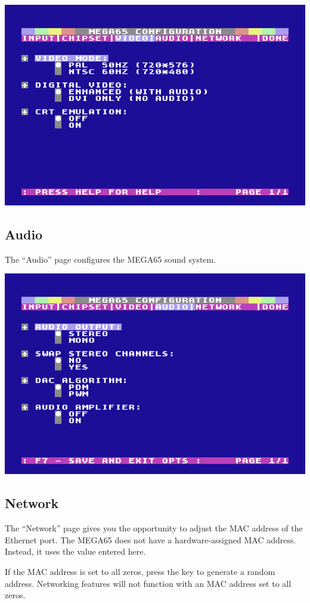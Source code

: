 \begin{center}
  \includegraphics[width=0.7\linewidth]{images/ss-m65config-3.png}
\end{center}

\subsection{Audio}

The ``Audio'' page configures the MEGA65 sound system.

\begin{center}
  \includegraphics[width=0.7\linewidth]{images/ss-m65config-4.png}
\end{center}

\subsection{Network}

The ``Network'' page gives you the opportunity to adjust the MAC address of the Ethernet port. The MEGA65 does not have a hardware-assigned MAC address. Instead, it uses the value entered here.

If the MAC address is set to all zeros, press the  key to generate a random address. Networking features will not function with an MAC address set to all zeros.

